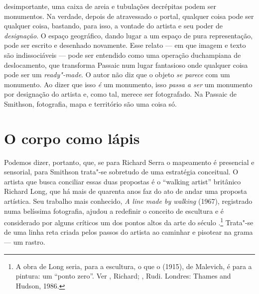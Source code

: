 desimportante, uma caixa de areia e tubulações decrépitas podem ser
monumentos. Na verdade, depois de atravessado o portal, qualquer coisa
pode ser qualquer coisa, bastando, para isso, a vontade do artista e seu
poder de \emph{designação}. O espaço geográfico, dando lugar a um espaço
de pura representação, pode ser escrito e desenhado novamente. Esse
relato --- em que imagem e texto são indissociáveis --- pode ser entendido
como uma operação duchampiana de deslocamento, que transforma Passaic
num lugar fantasioso onde qualquer coisa pode ser um \emph{ready"-made}.
O autor não diz que o objeto \emph{se parece} com um monumento. Ao dizer
que isso \emph{é} um monumento, isso \emph{passa a ser} um monumento por
designação do artista e, como tal, merece ser fotografado. Na Passaic de
Smithson, fotografia, mapa e território são uma coisa só.

\chapter{O corpo como lápis}

Podemos dizer, portanto, que, se para Richard Serra o mapeamento é
presencial e sensorial, para Smithson trata"-se sobretudo de uma
estratégia conceitual. O artista que busca conciliar essas duas
propostas é o ``walking artist'' britânico Richard Long, que há mais de
quarenta anos faz do ato de andar uma proposta artística. Seu trabalho
mais conhecido, \emph{A line made by walking} (1967), registrado numa
belíssima fotografia, ajudou a redefinir o conceito de escultura e é
considerado por alguns críticos um dos pontos altos da arte do século
.\footnote{A obra de Long seria, para a escultura, o que o
  {} (1915), de Malevich, é para a pintura: um
  ``ponto zero''. Ver , Richard; , Rudi. {} Londres: Thames and Hudson, 1986.} Trata"-se de uma linha reta
criada pelos passos do artista ao caminhar e pisotear na grama --- um
rastro.

